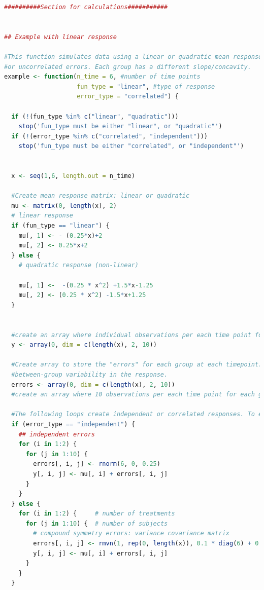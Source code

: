\documentclass[
]{article}
\begin{document}
\begin{lstlisting}[language=R]
##########Section for calculations###########


## Example with linear response

#This function simulates data using a linear or quadratic mean response and each with correlated
#or uncorrelated errors. Each group has a different slope/concavity.
example <- function(n_time = 6, #number of time points
                    fun_type = "linear", #type of response
                    error_type = "correlated") {
  
  if (!(fun_type %in% c("linear", "quadratic")))
    stop('fun_type must be either "linear", or "quadratic"')
  if (!(error_type %in% c("correlated", "independent")))
    stop('fun_type must be either "correlated", or "independent"')
  
  
  x <- seq(1,6, length.out = n_time)
  
  #Create mean response matrix: linear or quadratic
  mu <- matrix(0, length(x), 2)
  # linear response
  if (fun_type == "linear") {
    mu[, 1] <- - (0.25*x)+2  
    mu[, 2] <- 0.25*x+2
  } else {
    # quadratic response (non-linear)
    
    mu[, 1] <-  -(0.25 * x^2) +1.5*x-1.25
    mu[, 2] <- (0.25 * x^2) -1.5*x+1.25
  }
  
 
  #create an array where individual observations per each time point for each group are to be stored. Currently using 10 observations per timepoint
  y <- array(0, dim = c(length(x), 2, 10))
  
  #Create array to store the "errors" for each group at each timepoint. The "errors" are the 
  #between-group variability in the response.
  errors <- array(0, dim = c(length(x), 2, 10))
  #create an array where 10 observations per each time point for each group are to be stored
  
  #The following loops create independent or correlated responses. To each value of mu (mean response per group) a randomly generated error (correlated or uncorrelated) is added and thus the individual response is created.
  if (error_type == "independent") {
    ## independent errors
    for (i in 1:2) {
      for (j in 1:10) {
        errors[, i, j] <- rnorm(6, 0, 0.25)
        y[, i, j] <- mu[, i] + errors[, i, j]
      }
    }
  } else {
    for (i in 1:2) {     # number of treatments
      for (j in 1:10) {  # number of subjects
        # compound symmetry errors: variance covariance matrix
        errors[, i, j] <- rmvn(1, rep(0, length(x)), 0.1 * diag(6) + 0.25 * matrix(1, 6, 6))
        y[, i, j] <- mu[, i] + errors[, i, j]
      }
    }
  }    
  

\end{lstlisting}
\end{document}
